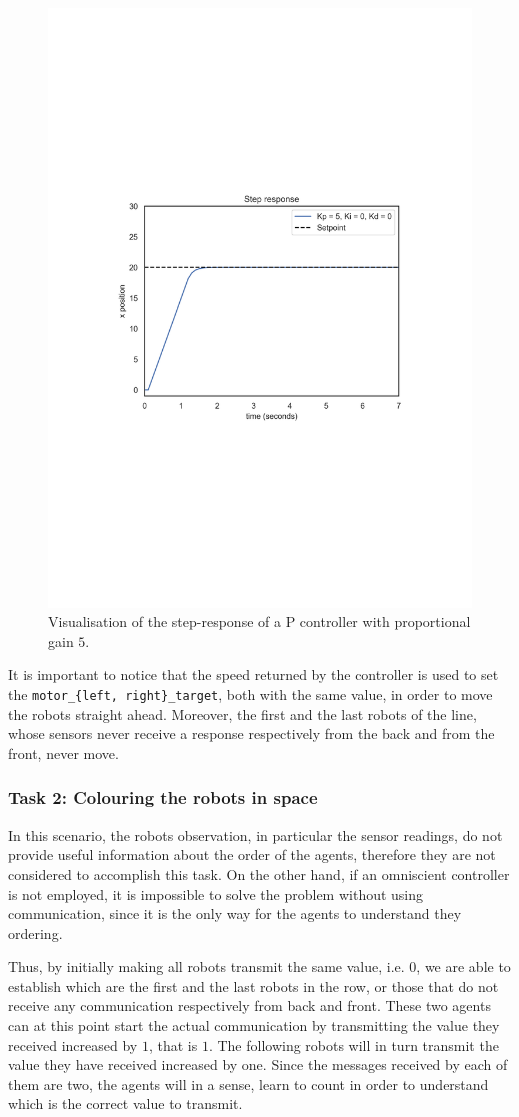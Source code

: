 \begin{figure}[htb]
	\centering
	\includegraphics[width=.5\textwidth]{contents/images/Step-responsep=kp5ki0kd0}
	\caption[Step response of the proportinal PID controller.]{Visualisation of the 
		step-response of a P controller with proportional 
		gain $5$.}
	\label{fig:pid}
\end{figure}

It is important to notice that the speed returned by the controller is used to set the 
\texttt{motor\_\{left, right\}\_target}, both with the same value, in order to move 
the robots straight ahead. Moreover, the first and the last robots of the line, 
whose sensors never receive a response respectively from the back and from the 
front, never move.

\subsubsection{Task 2: Colouring the robots in space}
In this scenario, the robots observation, in particular the sensor readings, do not 
provide useful information about the order of the agents, therefore they are not 
considered to accomplish this task.
On the other hand, if an omniscient controller is not employed, it is impossible to 
solve the problem without using communication, since it is the only way for the 
agents to understand they ordering.

Thus, by initially making all robots transmit the same value, i.e. $0$, we are able 
to establish which are the first and the last robots in the row, or those that do not 
receive any communication respectively from back and front. 
These two agents can at this point start the actual communication by transmitting 
the value they received increased by $1$, that is $1$. 
The following robots will in turn transmit the value they have received increased 
by one. Since the messages received by each of them are two, the agents will in a 
sense, learn to count in order to understand which is the correct value to 
transmit.

